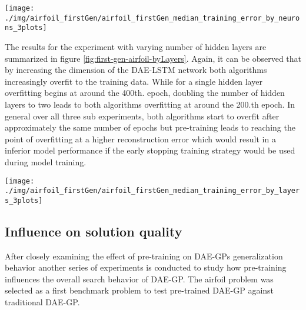 \documentclass[
  11pt,
]{article}
\let\origfigure\figure
\let\endorigfigure\endfigure
\renewenvironment{figure}[1][2] {
    \expandafter\origfigure\expandafter[H]
} {
    \endorigfigure
}
\begin{document}
\begin{figure}[c]

{\centering \texttt{[image: ./img/airfoil\_firstGen/airfoil\_firstGen\_median\_training\_error\_by\_neurons\_3plots]} 

}

\caption{First Generation Median Reconstruction Error for variable number of hidden Neurons}\label{fig:first-gen-airfoil-byNeurons}
\end{figure}

The results for the experiment with varying number of hidden layers are summarized in figure \ref{fig:first-gen-airfoil-byLayers}.
Again, it can be observed that by increasing the dimension of the DAE-LSTM network both algorithms increasingly overfit to the training data.
While for a single hidden layer overfitting begins at around the 400th.
epoch, doubling the number of hidden layers to two leads to both algorithms overfitting at around the 200.th epoch.
In general over all three sub experiments, both algorithms start to overfit after approximately the same number of epochs but pre-training leads to reaching the point of overfitting at a higher reconstruction error which would result in a inferior model performance if the early stopping training strategy would be used during model training.

\begin{figure}[c]

{\centering \texttt{[image: ./img/airfoil\_firstGen/airfoil\_firstGen\_median\_training\_error\_by\_layers\_3plots]} 

}

\caption{First Generation Median Reconstruction Error for variable number of hidden Layers}\label{fig:first-gen-airfoil-byLayers}
\end{figure}

\hypertarget{influence-on-solution-quality}{%
\subsection{Influence on solution quality}\label{influence-on-solution-quality}}

After closely examining the effect of pre-training on DAE-GPs generalization behavior another series of experiments is conducted to study how pre-training influences the overall search behavior of DAE-GP.
The airfoil problem was selected as a first benchmark problem to test pre-trained DAE-GP against traditional DAE-GP.
\end{document}
